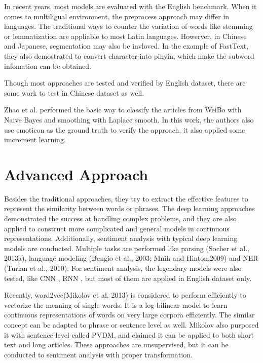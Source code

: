In recent years, most models are evaluated with the English benchmark. When it comes to multiligual environment, the preprocess approach may differ in languages. The traditional ways to counter the variation of words like stemming or lemmatization are appliable to most Latin languages.
Howerver, in Chinese and Japanese, segmentation may also be invloved. In the example of FastText\cite{joulin2016fasttext}, they also demostrated to convert character into pinyin, which make the subword infomation can be obtained. 

Though most approaches are tested and verified by English dataset, there are some work to test in Chinese dataset as well.

Zhao et al. \cite{zhao2012moodlens} performed the basic way to classify the articles from WeiBo with Naive Bayes and smoothing with Laplace smooth.  
In this work, the authors also use emoticon as the ground truth to verify the approach, it also applied some imcrement learning. \\


\section{Advanced Approach}

Besides the traditional approaches, they try to extract the effective features to represent the similarity between words or phrases.
The deep learning approaches demonstrated the success at handling complex problems, and they are also applied to construct more complicated and general models in continuous representations.
Additionally, sentiment analysis with typical deep learning models are conducted. Multiple tasks are performed like parsing (Socher et al., 2013a), language
modeling (Bengio et al., 2003; Mnih and Hinton,2009) and NER (Turian et al., 2010). For sentiment analysis, the legendary models were also tested, like CNN \cite{kim2014convolutional}, RNN \cite{arevian2007recurrent}, but most of them are applied in English dataset only. 

Recently, word2vec(Mikolov et al. 2013) \cite{word2vec} is considered to perform efficiently to vectorize the meaning of single words. It is a log-bilinear model to learn continuous
representations of words on very large corpora efficiently. The similar concept can be adapted to phrase or sentence level as well.
Mikolov also purposed it with sentence level \cite{PVDM} called PVDM, and claimed it can be applied to both short text and long articles. These approaches are unsupervised, but it can be conducted to sentiment analysis with proper transformation. 


